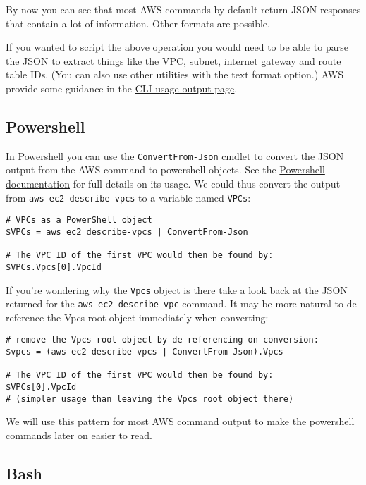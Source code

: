 \documentclass{pgnotes}
\begin{document}
By now you can see that most AWS commands by default return JSON responses that contain a lot of information.
Other formats are possible.

If you wanted to script the above operation you would need to be able to parse the JSON to extract things like the VPC, subnet, internet gateway and route table IDs.
(You can also use other utilities with the text format option.)
AWS provide some guidance in the \href{https://docs.aws.amazon.com/cli/latest/userguide/cli-usage-output.html}{CLI usage output page}.

\subsection{Powershell}

In Powershell you can use the \texttt{ConvertFrom-Json} cmdlet to convert the JSON output from the AWS command to powershell objects.
See the \href{https://docs.microsoft.com/en-us/powershell/module/microsoft.powershell.utility/convertfrom-json?view=powershell-7}{Powershell documentation} for full details on its usage.
We could thus convert the output from \texttt{aws ec2 describe-vpcs} to a variable named \texttt{VPCs}:
\begin{verbatim}
# VPCs as a PowerShell object
$VPCs = aws ec2 describe-vpcs | ConvertFrom-Json

# The VPC ID of the first VPC would then be found by:
$VPCs.Vpcs[0].VpcId
\end{verbatim}

If you're wondering why the \texttt{Vpcs} object is there take a look back at the JSON returned for the \texttt{aws ec2 describe-vpc} command.
It may be more natural to de-reference the Vpcs root object immediately when converting:

\begin{verbatim}
# remove the Vpcs root object by de-referencing on conversion: 
$vpcs = (aws ec2 describe-vpcs | ConvertFrom-Json).Vpcs

# The VPC ID of the first VPC would then be found by:
$VPCs[0].VpcId
# (simpler usage than leaving the Vpcs root object there)
\end{verbatim}

We will use this pattern for most AWS command output to make the powershell commands later on easier to read.

\subsection{Bash}
\end{document}
